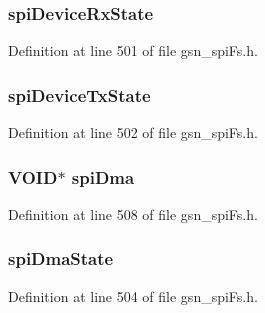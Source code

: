 \hypertarget{a00232_a219d771e0676f3ba6fa87f91ee7f9970}{
\subsubsection[{spiDeviceRxState}]{ {\bf spiDeviceRxState}}}
\label{a00232_a219d771e0676f3ba6fa87f91ee7f9970}


Definition at line 501 of file gsn\_\-spiFs.h.

\hypertarget{a00232_a9dd73e811fd5db3e9717c05a8446e413}{
\subsubsection[{spiDeviceTxState}]{ {\bf spiDeviceTxState}}}
\label{a00232_a9dd73e811fd5db3e9717c05a8446e413}


Definition at line 502 of file gsn\_\-spiFs.h.

\hypertarget{a00232_ab08af989c36bfccd7ef415ab4723fec7}{
\subsubsection[{spiDma}]{\setlength{\rightskip}{0pt plus 5cm}VOID$\ast$ {\bf spiDma}}}
\label{a00232_ab08af989c36bfccd7ef415ab4723fec7}


Definition at line 508 of file gsn\_\-spiFs.h.

\hypertarget{a00232_a079845a76b6a4c460dbec830d1f753dd}{
\subsubsection[{spiDmaState}]{ {\bf spiDmaState}}}
\label{a00232_a079845a76b6a4c460dbec830d1f753dd}


Definition at line 504 of file gsn\_\-spiFs.h.

